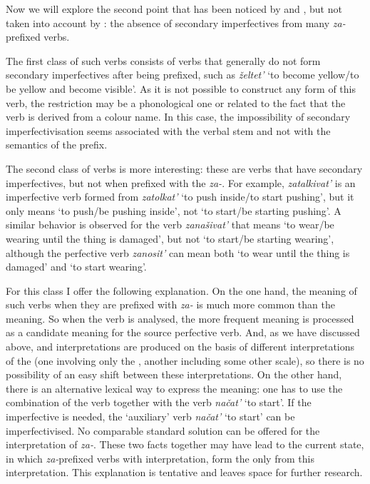 Now we will explore the second point that has been noticed by \citet{Svenonius:04b} and \citet{Braginsky:08}, but not taken into account by \citet{Tatevosov:09}: the absence of secondary imperfectives from many  \textit{za-}prefixed verbs. 

The first class of such verbs consists of verbs that generally do not form secondary imperfectives after being prefixed, such as \textit{\v{z}eltet'} `to become yellow/to be yellow and become visible'. As it is not possible to construct any  form of this verb, the restriction may be a phonological one or related to the fact that the verb is derived from a colour name. In this case, the impossibility of secondary imperfectivisation seems associated with the verbal stem and not with the  semantics of the prefix. 

The second class of verbs is more interesting: these are verbs that have secondary imperfectives, but not when prefixed with the  \textit{za-}. For example, \textit{zatalkivat'} is an imperfective verb formed from \textit{zatolkat'} `to push inside/to start pushing', but it only means `to push/be pushing inside', not `to start/be starting pushing'. A similar behavior is observed for the verb \textit{zana\v{s}ivat'} that means `to wear/be wearing until the thing is damaged', but not `to start/be starting wearing', although the perfective verb \textit{zanosit'} can mean both `to wear until the thing is damaged' and `to start wearing'.

For this class I offer the following explanation. On the one hand, the  meaning of such verbs when they are prefixed with \textit{za-} is much more common than the  meaning. So when the  verb is analysed, the more frequent meaning is processed as a candidate meaning for the source perfective verb. And, as we have discussed above,  and  interpretations are produced on the basis of different interpretations of the  (one involving only the , another including some other scale), so there is no possibility of an easy shift between these interpretations. On the other hand, there is an alternative lexical way to express the  meaning: one has to use the combination of the  verb together with the verb \textit{na\v{c}at'} `to start'. If the imperfective is needed, the `auxiliary' verb \textit{na\v{c}at'} `to start' can be imperfectivised. No comparable standard solution can be offered for the  interpretation of \textit{za-}. These two facts together may have lead to the current state, in which \textit{za-}prefixed verbs with  interpretation, form the  only from this interpretation. This explanation is tentative and leaves space for further research.

